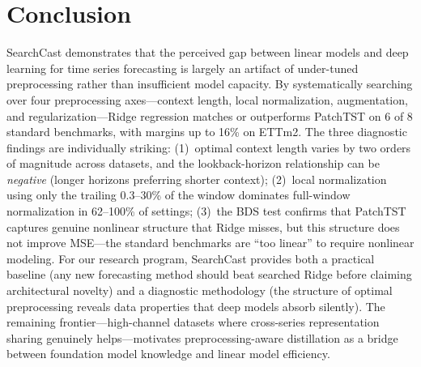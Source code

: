 \documentclass[11pt,a4paper]{article}
\begin{document}
\section{Conclusion}

SearchCast demonstrates that the perceived gap between linear models and deep learning for time series forecasting is largely an artifact of under-tuned preprocessing rather than insufficient model capacity. By systematically searching over four preprocessing axes---context length, local normalization, augmentation, and regularization---Ridge regression matches or outperforms PatchTST on 6 of 8 standard benchmarks, with margins up to 16\% on ETTm2. The three diagnostic findings are individually striking: (1)~optimal context length varies by two orders of magnitude across datasets, and the lookback-horizon relationship can be \emph{negative} (longer horizons preferring shorter context); (2)~local normalization using only the trailing 0.3--30\% of the window dominates full-window normalization in 62--100\% of settings; (3)~the BDS test confirms that PatchTST captures genuine nonlinear structure that Ridge misses, but this structure does not improve MSE---the standard benchmarks are ``too linear'' to require nonlinear modeling. For our research program, SearchCast provides both a practical baseline (any new forecasting method should beat searched Ridge before claiming architectural novelty) and a diagnostic methodology (the structure of optimal preprocessing reveals data properties that deep models absorb silently). The remaining frontier---high-channel datasets where cross-series representation sharing genuinely helps---motivates preprocessing-aware distillation as a bridge between foundation model knowledge and linear model efficiency.
\end{document}
